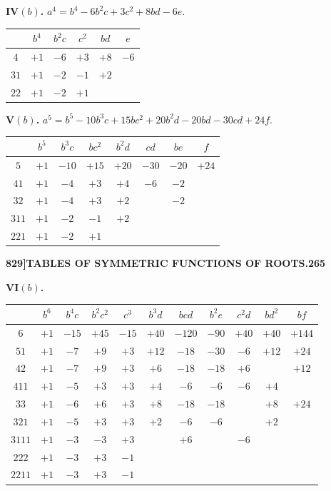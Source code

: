 \documentclass[11pt,a4paper]{book}
\begin{document}
\medskip

\noindent\textbf{IV$(b)$.} $a^4 = b^4 - 6b^2c + 3c^2 + 8bd - 6e$.
\begin{center}
\begin{tabular}{c|c|c|c|c|c}
& $b^4$ & $b^2c$ & $c^2$ & $bd$ & $e$ \\
\hline
$4$ & $+1$ & $-6$ & $+3$ & $+8$ & $-6$ \\
$31$ & $+1$ & $-2$ & $-1$ & $+2$ & \\
$22$ & $+1$ & $-2$ & $+1$ & &
\end{tabular}
\end{center}

\medskip

\noindent\textbf{V$(b)$.} $a^5 = b^5 - 10b^3c + 15bc^2 + 20b^2d - 20bd - 30cd + 24f$.
\begin{center}
\begin{tabular}{c|c|c|c|c|c|c|c}
& $b^5$ & $b^3c$ & $bc^2$ & $b^2d$ & $cd$ & $be$ & $f$ \\
\hline
$5$ & $+1$ & $-10$ & $+15$ & $+20$ & $-30$ & $-20$ & $+24$ \\
$41$ & $+1$ & $-4$ & $+3$ & $+4$ & $-6$ & $-2$ & \\
$32$ & $+1$ & $-4$ & $+3$ & $+2$ & & $-2$ & \\
$311$ & $+1$ & $-2$ & $-1$ & $+2$ & & & \\
$221$ & $+1$ & $-2$ & $+1$ & & & &
\end{tabular}
\end{center}

\newpage
\setcounter{page}{265}

\noindent\textbf{829]}\hfill\textbf{TABLES OF SYMMETRIC FUNCTIONS OF ROOTS.}\hfill\textbf{265}

\bigskip

\noindent\textbf{VI$(b)$.}
\begin{center}
\begin{tabular}{c|c|c|c|c|c|c|c|c|c|c}
& $b^6$ & $b^4c$ & $b^2c^2$ & $c^3$ & $b^3d$ & $bcd$ & $b^2e$ & $c^2d$ & $bd^2$ & $bf$ \\
\hline
$6$ & $+1$ & $-15$ & $+45$ & $-15$ & $+40$ & $-120$ & $-90$ & $+40$ & $+40$ & $+144$ \\
$51$ & $+1$ & $-7$ & $+9$ & $+3$ & $+12$ & $-18$ & $-30$ & $-6$ & $+12$ & $+24$ \\
$42$ & $+1$ & $-7$ & $+9$ & $+3$ & $+6$ & $-18$ & $-18$ & $+6$ & & $+12$ \\
$411$ & $+1$ & $-5$ & $+3$ & $+3$ & $+4$ & $-6$ & $-6$ & $-6$ & $+4$ & \\
$33$ & $+1$ & $-6$ & $+6$ & $+3$ & $+8$ & $-18$ & $-18$ & & $+8$ & $+24$ \\
$321$ & $+1$ & $-5$ & $+3$ & $+3$ & $+2$ & $-6$ & $-6$ & & $+2$ & \\
$3111$ & $+1$ & $-3$ & $-3$ & $+3$ & & $+6$ & & $-6$ & & \\
$222$ & $+1$ & $-3$ & $+3$ & $-1$ & & & & & & \\
$2211$ & $+1$ & $-3$ & $+3$ & $-1$ & & & & & &
\end{tabular}
\end{center}
\end{document}

